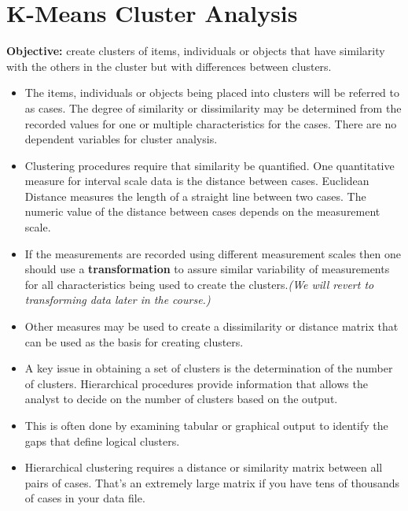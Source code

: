\documentclass[a4paper,12pt]{article}
\begin{document}
\section{K-Means Cluster Analysis}
\noindent \textbf{Objective:} create clusters of items, individuals or objects that have similarity with the others in the cluster but with differences between clusters.  

\begin{itemize}
	\item The items, individuals or objects being placed into clusters will be referred to as cases.  The degree of similarity or dissimilarity may be determined from the recorded values for one or multiple characteristics for the cases. There are no dependent variables for cluster analysis.  
\item Clustering procedures require that similarity be quantified.  One quantitative measure for interval scale data is the distance between cases.  Euclidean Distance measures the length of a straight line between two cases.  The numeric value of the distance between cases depends on the measurement scale.  
\item If the measurements are recorded using different measurement scales then one should use a \textbf{transformation} to assure similar variability of measurements for all characteristics being used to create the clusters.\textit{(We will revert to transforming data later in the course.) }
\item Other measures may be used to create a dissimilarity or distance matrix that can be used as the basis for creating clusters. %
	
\item A key issue in obtaining a set of clusters is the determination of the number of clusters.  Hierarchical procedures provide information that allows the analyst to decide on the number of clusters based on the output. 
\item  This is often done by examining tabular or graphical output to identify the gaps that define logical clusters.  
	\item Hierarchical clustering requires a distance or similarity matrix between all pairs of cases. That's an extremely large matrix if you have tens of thousands of cases in your data file.


\end{itemize}
\end{document}
